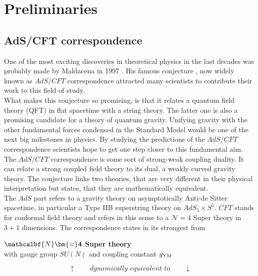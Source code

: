 \section{Preliminaries}
\subsection{AdS/CFT correspondence}
%
%
One of the most exciting discoveries in theoretical physics in the last decades was probably made by Maldacena in 1997 \cite{maldacena1}. His famous conjecture , now widely known as $AdS/CFT$ correspondence attracted many scientists to contribute their work to this field of study.\\
What makes this conjecture so promising, is that it relates a quantum field theory (QFT) in flat spacetime with a string theory. The latter one is also a promising candidate for a theory of quantum gravity. Unifying gravity with the other fundamental forces condensed in the Standard Model would be one of the next big milestones in physics. By studying the predictions of the $AdS/CFT$ correspondence scientists hope to get one step closer to this fundamental aim. The $AdS/CFT$ correspondence is some sort of strong-weak coupling duality. It can relate a strong coupled field theory to its dual, a weakly curved gravity theory. The conjecture links two theories, that are very different in their physical interpretation but states, that they are mathematically equivalent.\\
The $AdS$ part refers to a gravity theory on asymptotically Anti-de Sitter spacetime, in particular a Type IIB superstring theory on $AdS_{5}\times S^{5}$. $CFT$ stands for conformal field theory and refers in this sense to a $\mathcal{N}=4$ Super  theory in $3+1$ dimensions. The correspondence states in its strongest from \cite{Ammon:2015wua}
%
%
%
\begin{tcolorbox}[colback=white!95!black, colframe=white!90!black]
\begin{center}
\textbf{$\mathcalbf{N}\bm{=}\mathbf{4}$ Super  theory}\\
with gauge group $SU(N)$ and  coupling constant $g_{\rm YM}$
\end{center}
\end{tcolorbox}
%
\begin{equation*}
\uparrow \qquad \textit{dynamically equivalent to} \qquad \downarrow
\end{equation*}\hspace{1mm}
%
%
